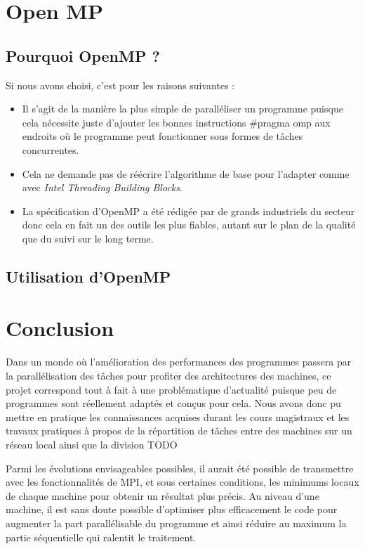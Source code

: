 \chapter{Open MP}
	\section{Pourquoi OpenMP ?}
		Si nous avons choisi, c'est pour les raisons suivantes : \\
		\begin{itemize}
			\item Il s'agit de la manière la plus simple de paralléliser un programme puisque cela nécessite juste d'ajouter les bonnes instructions \og \#pragma omp \fg aux endroits où le programme peut fonctionner sous formes de tâches concurrentes.
			\item Cela ne demande pas de réécrire l'algorithme de base pour l'adapter comme avec \emph{Intel Threading Building Blocks}.
			\item La spécification d'OpenMP a été rédigée par de grands industriels du secteur donc cela en fait un des outils les plus fiables, autant sur le plan de la qualité que du suivi sur le long terme.\\
		\end{itemize}
	
	\section{Utilisation d'OpenMP}


\chapter*{Conclusion}
	Dans un monde où l'amélioration des performances des programmes passera par la parallélisation des tâches pour profiter des architectures des machines, ce projet correspond tout à fait à une problématique d'actualité puisque peu de programmes sont réellement adaptés et conçus pour cela. Nous avons donc pu mettre en pratique les connaissances acquises durant les cours magistraux et les travaux pratiques à propos de la répartition de tâches entre des machines sur un réseau local ainsi que la division TODO

	Parmi les évolutions envisageables possibles, il aurait été possible de transmettre avec les fonctionnalités de MPI, et sous certaines conditions, les minimums locaux de chaque machine pour obtenir un résultat plus précis. Au niveau d'une machine, il est sans doute possible d'optimiser plus efficacement le code pour augmenter la part parallélisable du programme et ainsi réduire au maximum la partie séquentielle qui ralentit le traitement.
